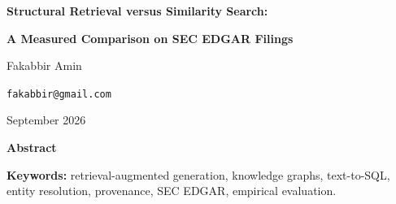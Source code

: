 \begin{center}
{\LARGE\bfseries Structural Retrieval versus Similarity Search:\par}
\vspace{0.35em}
{\LARGE\bfseries A Measured Comparison on SEC EDGAR Filings\par}
\vspace{1.1em}
{\large Fakabbir Amin\par}
\vspace{0.35em}
{\normalsize\texttt{fakabbir@gmail.com}\par}
\vspace{0.35em}
{\small September 2026\par}
\end{center}
\vspace{0.6em}

\begin{center}
\begin{minipage}{\abstractwidth}
\centerline{\large\bfseries Abstract}
\vspace{0.5em}
\small

\vspace{0.9em}

\noindent\textbf{Keywords:} retrieval-augmented generation, knowledge graphs,
text-to-SQL, entity resolution, provenance, SEC EDGAR, empirical evaluation.
\end{minipage}
\end{center}
\vspace{1.0em}
